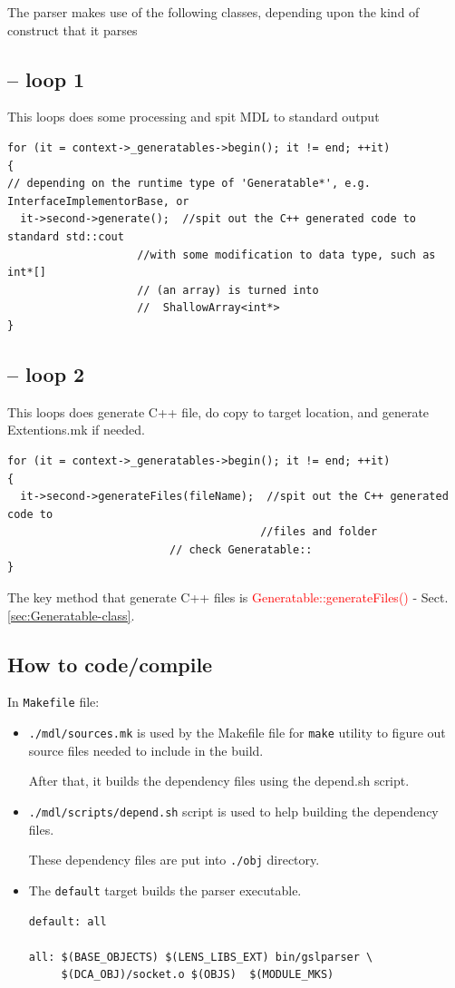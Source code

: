 The parser makes use of the following classes, depending upon the kind of construct that it parses


\subsection{-- loop 1}


This loops does some processing and spit MDL to standard output
\begin{verbatim}
for (it = context->_generatables->begin(); it != end; ++it)
{
// depending on the runtime type of 'Generatable*', e.g. InterfaceImplementorBase, or 
  it->second->generate();  //spit out the C++ generated code to standard std::cout
                    //with some modification to data type, such as int*[] 
                    // (an array) is turned into
                    //  ShallowArray<int*>
}
\end{verbatim}
 
\subsection{-- loop 2}

This loops does generate C++ file, do copy to target location, and generate Extentions.mk if needed.
\begin{verbatim}
for (it = context->_generatables->begin(); it != end; ++it)
{
  it->second->generateFiles(fileName);  //spit out the C++ generated code to
                                       //files and folder
                         // check Generatable::
}
\end{verbatim}


The key method that generate C++ files is
\textcolor{red}{Generatable::generateFiles()} -
Sect.\ref{sec:Generatable-class}.

\subsection{How to code/compile}


In \verb!Makefile! file:
\begin{itemize}
  \item \verb!./mdl/sources.mk! is used by the Makefile file for \verb!make! utility to
figure out source files needed to include in the build.

After that, it builds the dependency files using the depend.sh script.

  \item \verb!./mdl/scripts/depend.sh! script is used to  help building the
 dependency files. 
 
 These dependency files are put into \verb!./obj! directory.
 
 \item The \verb!default! target builds the parser executable.
\begin{verbatim}
default: all

all: $(BASE_OBJECTS) $(LENS_LIBS_EXT) bin/gslparser \
     $(DCA_OBJ)/socket.o $(OBJS)  $(MODULE_MKS)  
\end{verbatim} 
\end{itemize}


